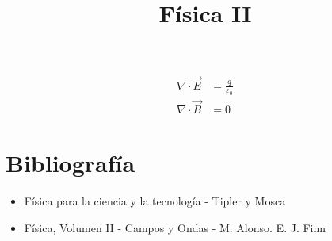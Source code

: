 \title{Física II}

\renewcommand*\contentsname{Índice}

\usepackage[margin=1.1in]{geometry}
\usepackage{amsmath, physics, amsthm, amsfonts, mdframed, subfiles, tikz, hyperref, fancyhdr, silence}

\pagestyle{fancy}

\WarningsOff[hyperref]
\WarningsOff[fancyhdr]


\newcommand{\R}{\mathbb{R}}

\usepackage{import}
\usepackage{pdfpages}
\usepackage{transparent}
\usepackage{xcolor}

\newcommand{\incfig}[2][1]{%
    \def\svgwidth{#1\columnwidth}
    {#2.pdf_tex}
}



\maketitle
\begin{equation}
	\begin{split}
		\nabla \cdot \vec{E} &= \frac{q}{\varepsilon_{0}}\\
		\nabla \cdot \vec{B} &= 0
	\end{split}
\end{equation}
\pagebreak
\tableofcontents
\pagebreak
\section{Bibliografía}
\begin{itemize}
	\item Física para la ciencia y la tecnología - Tipler y Mosca
	\item Física, Volumen II - Campos y Ondas - M. Alonso. E. J. Finn
\end{itemize}




